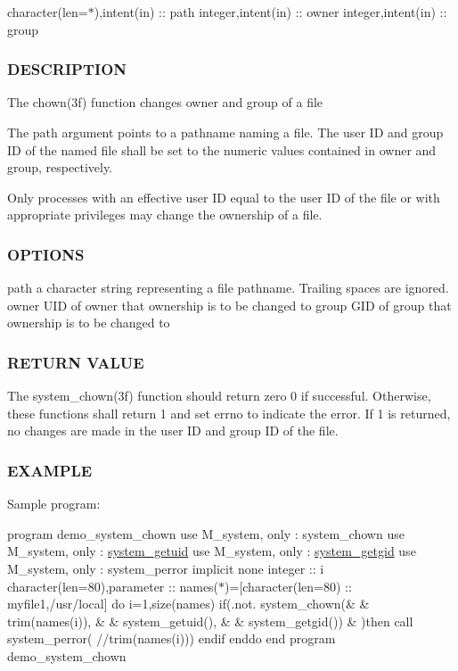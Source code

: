 character(len=$\ast$),intent(in) \+:\+: path integer,intent(in) \+:\+: owner integer,intent(in) \+:\+: group

\subsubsection*{D\+E\+S\+C\+R\+I\+P\+T\+I\+ON}

The chown(3f) function changes owner and group of a file

The path argument points to a pathname naming a file. The user ID and group ID of the named file shall be set to the numeric values contained in owner and group, respectively.

Only processes with an effective user ID equal to the user ID of the file or with appropriate privileges may change the ownership of a file.

\subsubsection*{O\+P\+T\+I\+O\+NS}

path a character string representing a file pathname. Trailing spaces are ignored. owner U\+ID of owner that ownership is to be changed to group G\+ID of group that ownership is to be changed to

\subsubsection*{R\+E\+T\+U\+RN V\+A\+L\+UE}

The system\+\_\+chown(3f) function should return zero 0 if successful. Otherwise, these functions shall return 1 and set errno to indicate the error. If 1 is returned, no changes are made in the user ID and group ID of the file.

\subsubsection*{E\+X\+A\+M\+P\+LE}

Sample program\+:

program demo\+\_\+system\+\_\+chown use M\+\_\+system, only \+: system\+\_\+chown use M\+\_\+system, only \+: \mbox{\hyperlink{interfacem__system_1_1system__getuid}{system\+\_\+getuid}} use M\+\_\+system, only \+: \mbox{\hyperlink{interfacem__system_1_1system__getgid}{system\+\_\+getgid}} use M\+\_\+system, only \+: system\+\_\+perror implicit none integer \+:\+: i character(len=80),parameter \+:\+: names($\ast$)=\mbox{[}character(len=80) \+:\+: \textquotesingle{}myfile1\textquotesingle{},\textquotesingle{}/usr/local\textquotesingle{}\mbox{]} do i=1,size(names) if(.not. system\+\_\+chown(\& \& trim(names(i)), \& \& system\+\_\+getuid(), \& \& system\+\_\+getgid()) \& )then call system\+\_\+perror( \textquotesingle{}//trim(names(i))) endif enddo end program demo\+\_\+system\+\_\+chown 


